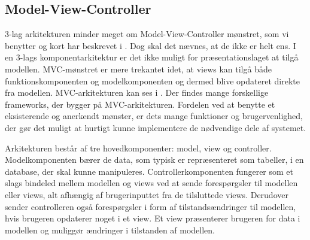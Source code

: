 \subsection{Model-View-Controller}
\label{subsec:mvc}
3-lag arkitekturen minder meget om Model-View-Controller mønstret, som vi benytter og kort har beskrevet i . Dog skal det nævnes, at de ikke er helt ens. I en 3-lags komponentarkitektur er det ikke muligt for præsentationslaget at tilgå modellen. MVC-mønstret er mere trekantet idet, at views kan tilgå både funktionskomponenten og modelkomponenten og dermed blive opdateret direkte fra modellen\cite{designpatterns}. MVC-arkitekturen kan ses i . Der findes mange forskellige frameworks, der bygger på MVC-arkitekturen. Fordelen ved at benytte et eksisterende og anerkendt mønster, er dets mange funktioner og brugervenlighed, der gør det muligt at hurtigt kunne implementere de nødvendige dele af systemet.

Arkitekturen består af tre hovedkomponenter: model, view og controller. Modelkomponenten bærer de data, som typisk er repræsenteret som tabeller, i en database, der skal kunne manipuleres. Controllerkomponenten fungerer som et slags bindeled mellem modellen og views ved at sende forespørgsler til modellen eller views, alt afhængig af brugerinputtet fra de tilsluttede views. Derudover sender controlleren også forespørgsler i form af tilstandsændringer til modellen, hvis brugeren \fx opdaterer noget i et view. Et view præsenterer brugeren for data i modellen og muliggør ændringer i tilstanden af modellen.
